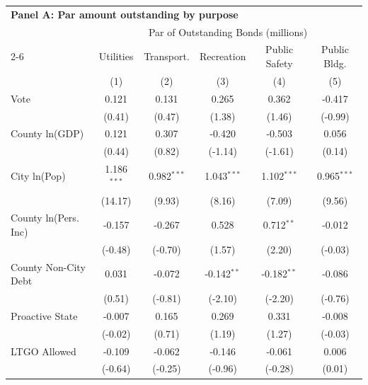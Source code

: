 \begingroup
\centering
\begin{tabular*}{\textwidth}{@{\extracolsep{\fill}}lccccc}
\multicolumn{6}{l}{\textbf{Panel A: Par amount outstanding by purpose}}\\

\addlinespace
   \toprule
    & \multicolumn{5}{c}{Par of Outstanding Bonds (millions)}\\
   \cmidrule(lr){2-6}
                        & Utilities     & Transport.     & Recreation    & Public Safety  & Public Bldg. \\   
                        & (1)           & (2)            & (3)           & (4)            & (5)\\  
   \midrule 
   Vote                 & 0.121         & 0.131          & 0.265         & 0.362          & -0.417\\   
                        & (0.41)       & (0.47)        & (1.38)       & (1.46)        & (-0.99)\\   
   County ln(GDP)       & 0.121         & 0.307          & -0.420        & -0.503         & 0.056\\   
                        & (0.44)       & (0.82)        & (-1.14)      & (-1.61)       & (0.14)\\   
   City ln(Pop)         & 1.186$^{***}$ & 0.982$^{***}$  & 1.043$^{***}$ & 1.102$^{***}$  & 0.965$^{***}$\\   
                        & (14.17)      & (9.93)        & (8.16)       & (7.09)        & (9.56)\\   
   County ln(Pers. Inc) & -0.157        & -0.267         & 0.528         & 0.712$^{**}$   & -0.012\\   
                        & (-0.48)      & (-0.70)       & (1.57)       & (2.20)        & (-0.03)\\   
   County Non-City Debt & 0.031         & -0.072         & -0.142$^{**}$ & -0.182$^{**}$  & -0.086\\   
                        & (0.51)       & (-0.81)       & (-2.10)      & (-2.20)       & (-0.76)\\   
   Proactive State      & -0.007        & 0.165          & 0.269         & 0.331          & -0.008\\   
                        & (-0.02)      & (0.71)        & (1.19)       & (1.27)        & (-0.03)\\   
   LTGO Allowed         & -0.109        & -0.062         & -0.146        & -0.061         & 0.006\\   
                        & (-0.64)      & (-0.25)       & (-0.96)      & (-0.28)       & (0.01)\\   

\end{tabular*}
